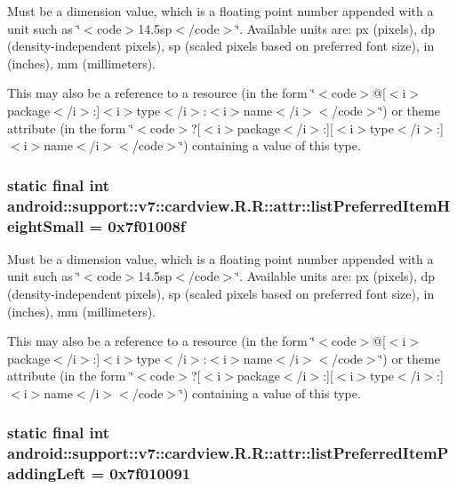 Must be a dimension value, which is a floating point number appended with a unit such as \char`\"{}$<$code$>$14.5sp$<$/code$>$\char`\"{}. Available units are: px (pixels), dp (density-independent pixels), sp (scaled pixels based on preferred font size), in (inches), mm (millimeters). 

This may also be a reference to a resource (in the form \char`\"{}$<$code$>$@\mbox{[}$<$i$>$package$<$/i$>$:\mbox{]}$<$i$>$type$<$/i$>$:$<$i$>$name$<$/i$>$$<$/code$>$\char`\"{}) or theme attribute (in the form \char`\"{}$<$code$>$?\mbox{[}$<$i$>$package$<$/i$>$:\mbox{]}\mbox{[}$<$i$>$type$<$/i$>$:\mbox{]}$<$i$>$name$<$/i$>$$<$/code$>$\char`\"{}) containing a value of this type. \hypertarget{classandroid_1_1support_1_1v7_1_1cardview_1_1_r_1_1attr_792da1eeef6f27123967a4cd0f42cfdf}{
\subsubsection[{listPreferredItemHeightSmall}]{\setlength{\rightskip}{0pt plus 5cm}static final int android::support::v7::cardview.R.R::attr::listPreferredItemHeightSmall = 0x7f01008f}}
\label{classandroid_1_1support_1_1v7_1_1cardview_1_1_r_1_1attr_792da1eeef6f27123967a4cd0f42cfdf}


Must be a dimension value, which is a floating point number appended with a unit such as \char`\"{}$<$code$>$14.5sp$<$/code$>$\char`\"{}. Available units are: px (pixels), dp (density-independent pixels), sp (scaled pixels based on preferred font size), in (inches), mm (millimeters). 

This may also be a reference to a resource (in the form \char`\"{}$<$code$>$@\mbox{[}$<$i$>$package$<$/i$>$:\mbox{]}$<$i$>$type$<$/i$>$:$<$i$>$name$<$/i$>$$<$/code$>$\char`\"{}) or theme attribute (in the form \char`\"{}$<$code$>$?\mbox{[}$<$i$>$package$<$/i$>$:\mbox{]}\mbox{[}$<$i$>$type$<$/i$>$:\mbox{]}$<$i$>$name$<$/i$>$$<$/code$>$\char`\"{}) containing a value of this type. \hypertarget{classandroid_1_1support_1_1v7_1_1cardview_1_1_r_1_1attr_8313b6168c0f795264cc752353fcb1e2}{
\subsubsection[{listPreferredItemPaddingLeft}]{\setlength{\rightskip}{0pt plus 5cm}static final int android::support::v7::cardview.R.R::attr::listPreferredItemPaddingLeft = 0x7f010091}}
\label{classandroid_1_1support_1_1v7_1_1cardview_1_1_r_1_1attr_8313b6168c0f795264cc752353fcb1e2}


